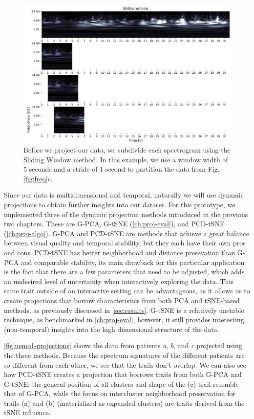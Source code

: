 \begin{figure}[ht]
\centering
\includegraphics[width=\linewidth]{figures/nemo/sliding.png}
\caption{Before we project our data, we subdivide each spectrogram using the Sliding Window method. In this example, we use a window width of 5 seconds and a stride of 1 second to partition the data from Fig. \ref{fig:freq}c.}
\label{fig:sliding}
\end{figure}

Since our data is multidimensional and temporal, naturally we will use dynamic projections to obtain further insights into our dataset.
For this prototype, we implemented three of the dynamic projection methods introduced in the previous two chapters. These are G-PCA, G-tSNE (\cref{ch:proj-eval}), and PCD-tSNE (\cref{ch:proj-algo}). 
G-PCA and PCD-tSNE are methods that achieve a great balance between visual quality and temporal stability, but they each have their own pros and cons. PCD-tSNE has better neighborhood and distance presevation than G-PCA and comparable stability, its main drawback for this particular application is the fact that there are a few parameters that need to be adjusted, which adds an undesired level of uncertainty when interactively exploring the data. This same trait outside of an interactive setting can be advantageous, as it allows us to create projections that borrow characteristics from both PCA and tSNE-based methods, as previously discussed in \cref{sec:results}. %
G-tSNE is a relatively unstable technique, as benchmarked in \cref{ch:proj-eval}, however, it still provides interesting (non-temporal) insights into the high dimensional structure of the data.

\cref{fig:nemo1-projections} shows the data from patients \textit{a}, \textit{b}, and \textit{c} projected using the three methods. Because the spectrum signatures of the different patients are so different from each other, we see that the trails don't overlap. We can also see how PCD-tSNE creates a projection that borrows traits from both G-PCA and G-tSNE: the general position of all clusters and shape of the (c) trail resemble that of G-PCA, while the focus on intercluster neighborhood preservation for trails (a) and (b) (materialized as expanded clusters) are traits derived from the tSNE influence.

